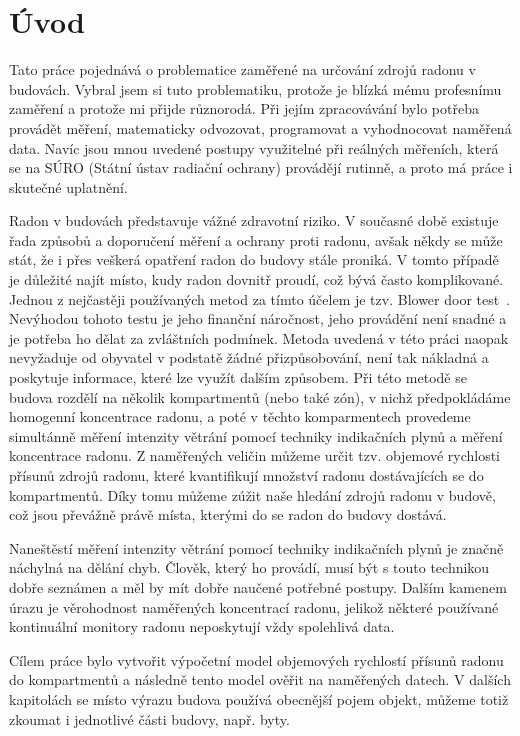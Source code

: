 \chapter{Úvod}
Tato práce pojednává o problematice zaměřené na určování zdrojů radonu v budovách. Vybral jsem si tuto problematiku, protože je blízká mému profesnímu zaměření a protože mi přijde různorodá. Při jejím zpracovávání bylo potřeba provádět měření, matematicky odvozovat, programovat a vyhodnocovat naměřená data. Navíc jsou mnou uvedené postupy využitelné při reálných měřeních, která se na SÚRO (Státní ústav radiační ochrany) provádějí rutinně, a proto má práce i skutečné uplatnění. 

Radon v budovách představuje vážné zdravotní riziko. V současné době existuje řada způsobů a doporučení měření a ochrany proti radonu, avšak někdy se může stát, že i přes veškerá opatření radon do budovy stále proniká. V tomto případě je důležité najít místo, kudy radon dovnitř proudí, což bývá často komplikované. Jednou z nejčastěji používaných metod za tímto účelem je tzv. Blower door test~\cite{wiki_blowerDoorTest}. Nevýhodou tohoto testu je jeho finanční náročnost, jeho provádění není snadné a je potřeba ho dělat za zvláštních podmínek. Metoda uvedená v této práci naopak nevyžaduje od obyvatel v podstatě žádné přizpůsobování, není tak nákladná a poskytuje informace, které lze využít dalším způsobem. Při této metodě se budova
rozdělí na několik kompartmentů (nebo také zón), v nichž předpokládáme homogenní koncentrace radonu, a poté v těchto komparmentech provedeme simultánně měření intenzity větrání pomocí techniky indikačních plynů a měření koncentrace radonu. Z naměřených veličin můžeme určit tzv. objemové rychlosti přísunů zdrojů radonu, které kvantifikují množství radonu dostávajících se do kompartmentů. Díky tomu můžeme zúžit naše hledání zdrojů radonu v budově, což jsou převážně právě místa, kterými do se radon do budovy dostává.

Naneštěstí měření intenzity větrání pomocí techniky indikačních plynů je značně náchylná na dělání chyb. Člověk, který ho provádí, musí být s touto technikou dobře seznámen a měl by mít dobře naučené potřebné postupy. Dalším kamenem úrazu je věrohodnost naměřených koncentrací radonu, jelikož některé používané kontinuální monitory radonu neposkytují vždy spolehlivá data.

Cílem práce bylo vytvořit výpočetní model objemových rychlostí přísunů radonu do kompartmentů a následně tento model ověřit na naměřených datech. V dalších kapitolách se místo výrazu budova používá obecnější pojem objekt, můžeme totiž zkoumat i jednotlivé části budovy, např. byty.
